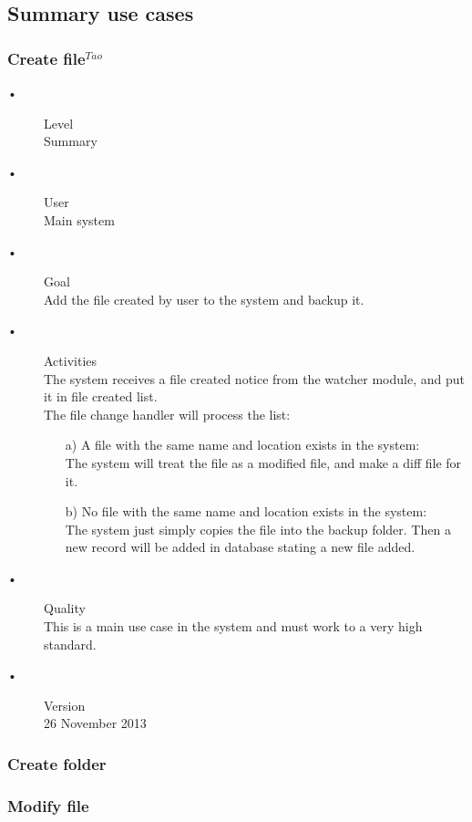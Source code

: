 \documentclass[12pt,a4paper]{article}
\begin{document}
\subsection{Summary use cases}


\subsubsection{Create file$^{Tao}$} 
\begin{description}
	\item[•] Level \hfill \\
	Summary
	\item[•] User \hfill \\
	Main system
	\item[•] Goal \hfill \\
	Add the file created by user to the system and backup it.
	\item[•] Activities \hfill \\
	The system receives a file created notice from the watcher module, and put it in file created list.\\
	The file change handler will process the list:
	\begin{enumerate}
		\item[a)]A file with the same name and location exists in the system: 
		\hfill \\
		The system will treat the file as a modified file, and make a diff  file for it.

		\item[b)]No file with the same name and location exists in the system: 
		\hfill \\
		The system just simply copies the file into the backup folder. Then a new record will be added in database stating a new file added.
	\end{enumerate}
	\item[•] Quality \hfill \\
	This is a main use case in the system and must work to a very high standard.
	\item[•] Version \hfill \\
	26 November 2013	
\end{description}
\subsubsection{Create folder} 	
\subsubsection{Modify file} 
\end{document}
